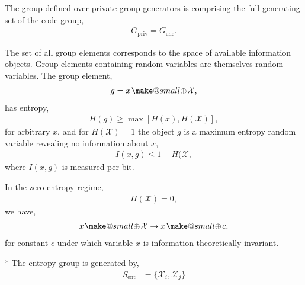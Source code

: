 \documentclass[twocolumn, aps, amsmath, amssymb, nofootinbib, superscriptaddress, longbibliography, doublefloatfix, table-of-contents, eqsecnum, rmp]{revtex4-2}
\makeatletter
\newcommand{\soplus}{{{\hspace{1pt}}{\mathbin{\mathpalette\make@small{\mathbin\oplus}}}}{\hspace{1pt}}}
\newcommand{\make@small}[2]{%
  \vcenter{\hbox{%
    \scalebox{0.6}{$\m@th#1#2$}%
  }}%
}
\makeatother
\begin{document}
The group defined over private group generators is comprising the full generating set of the code group,
\begin{align}
	G_\mathrm{priv} = G_\mathrm{enc}.
\end{align}



The set of all group elements corresponds to the space of available information objects. Group elements containing random variables are themselves random variables. The group element,
\begin{align}
	g = x\soplus \mathcal{X},
\end{align}
has entropy,
\begin{align}
	H(g) \geq \max[H(x), H(\mathcal{X})],
\end{align}
for arbitrary $x$, and for $H(\mathcal{X})=1$ the object $g$ is a maximum entropy random variable revealing no information about $x$,
\begin{align}
	I(x,g) \leq 1-H(\mathcal{X},
\end{align}
where $I(x,g)$ is measured per-bit.

In the zero-entropy regime,
\begin{align}
	H(\mathcal{X}) = 0,
\end{align}
we have,
\begin{align}
	x\soplus \mathcal{X} \to x\soplus c,
\end{align}	
for constant $c$ under which variable $x$ is information-theoretically invariant.

* The entropy group is generated by,
\begin{align}
	S_\mathrm{ent} &= \{\mathcal{X}_i,\mathcal{X}_j\}
\end{align}
\end{document}
